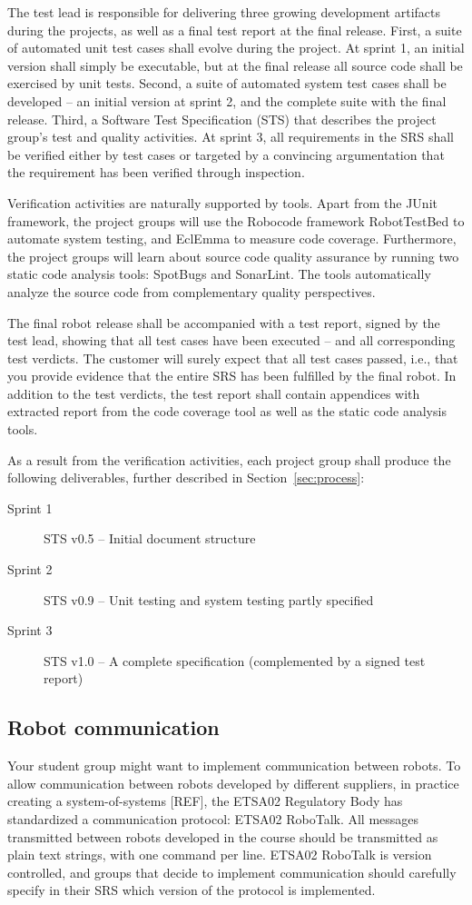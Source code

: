 \documentclass{scrreprt}
\begin{document}
The test lead is responsible for delivering three growing development artifacts during the projects, as well as a final test report at the final release. First, a suite of automated unit test cases shall evolve during the project. At sprint 1, an initial version shall simply be executable, but at the final release all source code shall be exercised by unit tests. Second, a suite of automated system test cases shall be developed -- an initial version at sprint 2, and the complete suite with the final release. Third, a Software Test Specification (STS) that describes the project group's test and quality activities. At sprint 3, all requirements in the SRS shall be verified either by test cases or targeted by a convincing argumentation that the requirement has been verified through inspection.

Verification activities are naturally supported by tools. Apart from the JUnit framework, the project groups will use the Robocode framework RobotTestBed to automate system testing, and EclEmma to measure code coverage. Furthermore, the project groups will learn about source code quality assurance by running two static code analysis tools: SpotBugs and SonarLint. The tools automatically analyze the source code from complementary quality perspectives.

The final robot release shall be accompanied with a test report, signed by the test lead, showing that all test cases have been executed -- and all corresponding test verdicts. The customer will surely expect that all test cases passed, i.e., that you provide evidence that the entire SRS has been fulfilled by the final robot. In addition to the test verdicts, the test report shall contain appendices with extracted report from the code coverage tool as well as the static code analysis tools.

As a result from the verification activities, each project group shall produce the following deliverables, further described in Section~\ref{sec:process}:
\begin{description}
\item[Sprint 1] STS v0.5 -- Initial document structure
\item[Sprint 2] STS v0.9 -- Unit testing and system testing partly specified
\item[Sprint 3] STS v1.0 -- A complete specification (complemented by a signed test report)
\end{description}

\subsection{Robot communication}
Your student group might want to implement communication between robots. To allow communication between robots developed by different suppliers, in practice creating a system-of-systems [REF], the ETSA02 Regulatory Body has standardized a communication protocol: ETSA02 RoboTalk. All messages transmitted between robots developed in the course should be transmitted as plain text strings, with one command per line. ETSA02 RoboTalk is version controlled, and groups that decide to implement communication should carefully specify in their SRS which version of the protocol is implemented.
\end{document}
